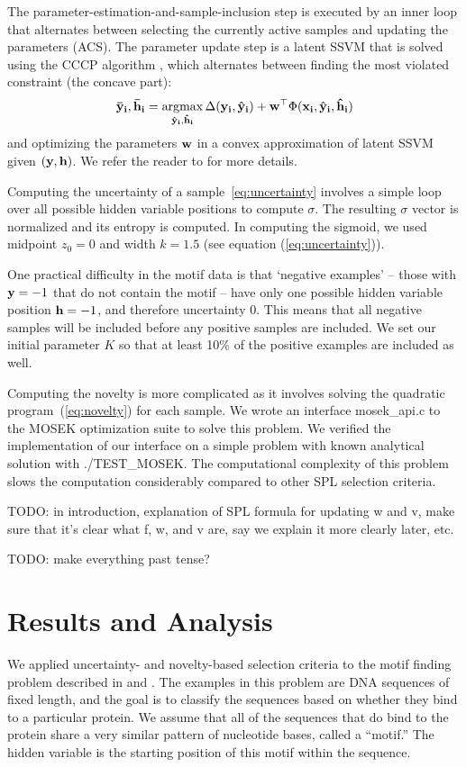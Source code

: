 \documentclass{article}
\newcommand{\mysection}[1]{\vspace{-4mm}\section{#1}\vspace{-4mm}}
\newcommand{\argmax}{\operatornamewithlimits{argmax}}
\newcommand{\mthb }{\begin{eqnarray*} }
\newcommand{\mthe }{\end {eqnarray*} }
\begin{document}
The parameter-estimation-and-sample-inclusion step is executed by an inner loop that alternates between selecting the currently active samples and updating the parameters ({\sc ACS}).  The parameter update step is a latent SSVM that is solved using the {\sc CCCP} algorithm \cite{SSVM}, which alternates between finding the most violated constraint (the concave part):
\mthb
{\bf\bar y_i,\bf\bar h_i} = \argmax_{{\bf\hat y_i},{\bf\hat h_i}} \Delta({\bf y_i,\bf\hat y_i})+{\bf w}^\top\Phi(\bf x_i,\bf\hat y_i,\bf\hat h_i)
\mthe
and optimizing the parameters $\bf w$ in a convex approximation of latent SSVM given $(\bf y, \bf h)$.  We refer the reader to \cite{SSVM} for more details.

Computing the uncertainty of a sample~\ref{eq:uncertainty} involves a simple loop over all possible hidden variable positions to compute $\sigma$.  The resulting $\sigma$ vector is normalized and its entropy is computed.  In computing the sigmoid, we used midpoint $z_0=0$ and width $k=1.5$ (see equation (\ref{eq:uncertainty})).

One practical difficulty in the motif data is that `negative examples' -- those with ${\bf y}=-1$ that do not contain the motif -- have only one possible hidden variable position ${\bf h}=-1$, and therefore uncertainty 0.  This means that all negative samples will be included before any positive samples are included.  We set our initial parameter $K$ so that at least 10\% of the positive examples are included as well. 

Computing the novelty is more complicated as it involves solving the quadratic program~(\ref{eq:novelty}) for each sample.  We wrote an interface {\sc mosek\_api.c} to the MOSEK optimization suite \cite{Mosek} to solve this problem.  We verified the implementation of our interface on a simple problem with known analytical solution with {\sc ./TEST\_MOSEK}.  The computational complexity of this problem slows the computation considerably compared to other SPL selection criteria.

TODO: in introduction, explanation of SPL formula for updating w and v, make sure that it's clear what f, w, and v are, say we explain it more clearly later, etc.

TODO: make everything past tense?

\mysection{Results and Analysis}
\label{sec:results}

We applied uncertainty- and novelty-based selection criteria to the motif finding problem described in \cite{SPL} and \cite{SSVM}. The examples in this problem are DNA sequences of fixed length, and the goal is to classify the sequences based on whether they bind to a particular protein. We assume that all of the sequences that do bind to the protein share a very similar pattern of nucleotide bases, called a ``motif.'' The hidden variable is the starting position of this motif within the sequence.
\end{document}

